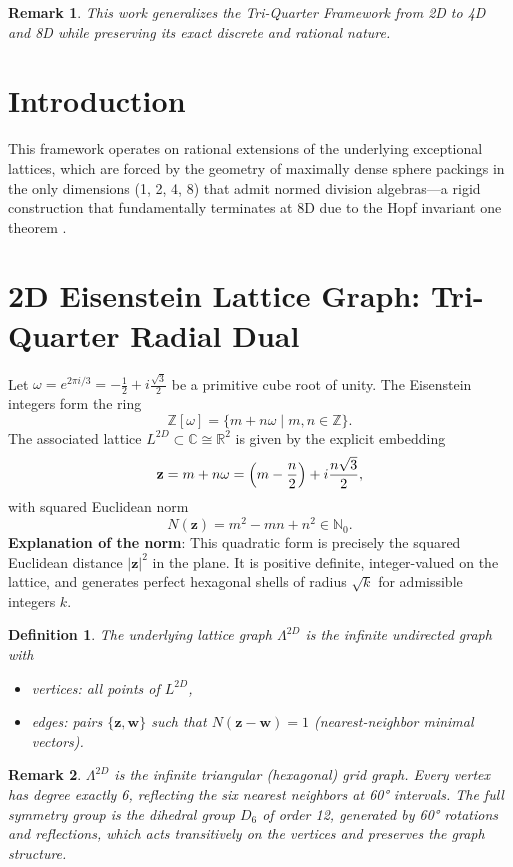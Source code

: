 \documentclass{article}
\newtheorem{definition}{Definition}
\newtheorem{remark}{Remark}
\begin{document}
\begin{remark}
This work generalizes the Tri-Quarter Framework \cite{Schmidt2025} from 2D to 4D and 8D while preserving its exact discrete and rational nature.
\end{remark}
\section{Introduction}
This framework operates on rational extensions of the underlying exceptional lattices, which are forced by the geometry of maximally dense sphere packings in the only dimensions (1, 2, 4, 8) that admit normed division algebras---a rigid construction that fundamentally terminates at 8D due to the Hopf invariant one theorem \cite{Adams1960}.
\section{2D Eisenstein Lattice Graph: Tri-Quarter Radial Dual}
Let \(\omega = e^{2\pi i / 3} = -\frac{1}{2} + i \frac{\sqrt{3}}{2}\) be a primitive cube root of unity. The Eisenstein integers form the ring
\[
\mathbb{Z}[\omega] = \{ m + n\omega \mid m,n \in \mathbb{Z} \}.
\]
The associated lattice \(L^{2D} \subset \mathbb{C} \cong \mathbb{R}^2\) is given by the explicit embedding
\[
\mathbf{z} = m + n\omega = \Bigl(m - \frac{n}{2}\Bigr) + i \frac{n\sqrt{3}}{2},
\]
with squared Euclidean norm
\[
N(\mathbf{z}) = m^2 - mn + n^2 \in \mathbb{N}_0.
\]
\textbf{Explanation of the norm}: This quadratic form is precisely the squared Euclidean distance \(|\mathbf{z}|^2\) in the plane. It is positive definite, integer-valued on the lattice, and generates perfect hexagonal shells of radius \(\sqrt{k}\) for admissible integers \(k\).
\begin{definition}
The \emph{underlying lattice graph} \(\Lambda^{2D}\) is the infinite undirected graph with
\begin{itemize}
  \item vertices: all points of \(L^{2D}\),
  \item edges: pairs \(\{\mathbf{z}, \mathbf{w}\}\) such that \(N(\mathbf{z} - \mathbf{w}) = 1\) (nearest-neighbor minimal vectors).
\end{itemize}
\end{definition}
\begin{remark}
\(\Lambda^{2D}\) is the infinite triangular (hexagonal) grid graph. Every vertex has degree exactly 6, reflecting the six nearest neighbors at 60° intervals. The full symmetry group is the dihedral group \(D_6\) of order 12, generated by 60° rotations and reflections, which acts transitively on the vertices and preserves the graph structure.
\end{remark}
\end{document}

